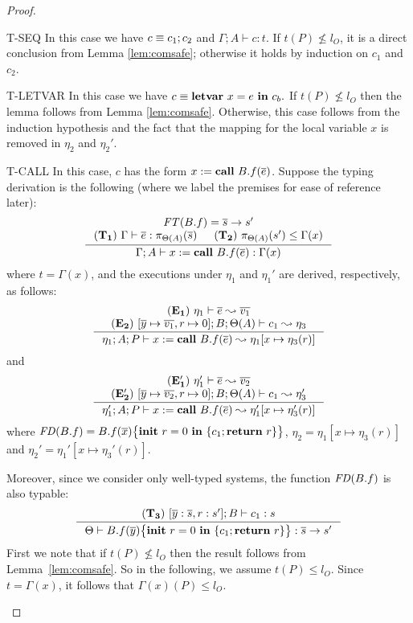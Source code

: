 {{{\begin{proof}
\begin{ProofEnumDesc}
\item[T-SEQ] In this case we have
  $c\equiv{c_1};{c_2}$ and $\Gamma;A\vdash c:t$. If $t(P)\not\leq l_{O}$, it is a direct conclusion from Lemma \ref{lem:comsafe}; otherwise it holds by induction on $c_1$ and $c_2$.

\item[T-LETVAR]
  In this case we have $c\equiv{\textbf{letvar}~ {x} = {e} ~\textbf{in}~ {c_b}}.$
  If $t(P) \nleq l_O$ then the lemma follows from Lemma \ref{lem:comsafe}.
  Otherwise, this case follows from the induction hypothesis and the fact
  that the mapping for the local variable $x$ is removed
  in $\eta_2$ and $\eta_2'.$
\item[T-CALL]
In this case, $c$ has the form
${x}:=\textbf{call}~{B.f}({\overline{e}})$. Suppose the typing
derivation is the following (where we label the premises
for ease of reference later):
$$
\inference
{
\FT(B.f) = \overline{s} \rightarrow s' \\
(\mathbf{T_1}) ~ \Gamma \vdash \overline{e} : \app{\overline{s}}{\Theta(A)} &
(\mathbf{T_2}) ~ \app{s'}{\Theta(A)} \leq \Gamma(x)}
{\Gamma; A \vdash \lcCALL{x}{B.f}{\overline{e}} :
 \Gamma(x)  }
$$
where $t = \Gamma(x)$,
and the executions under $\eta_1$ and $\eta_1'$ are
derived, respectively, as follows:
$$
\inference{
(\mathbf{E_1}) ~ \eta_1\vdash\overline{e} \leadsto \overline{v_1} \\
(\mathbf{E_2}) ~ [\overline{y} \mapsto \overline{v_1}, r \mapsto 0] ; B;
  \Theta(A) \vdash c_1 \leadsto \eta_3
}
{\eta_1; A; P \vdash \lcCALL{x}{B.f}{\overline{e}} \leadsto
              \eta_1 [x \mapsto \eta_3(r) ]}
$$
and
$$
\inference{
(\mathbf{E_1'}) ~ \eta_1'\vdash\overline{e} \leadsto \overline{v_2}
\\
(\mathbf{E_2'}) ~ [\overline{y} \mapsto \overline{v_2}, r \mapsto 0] ; B;
\Theta(A) \vdash c_1 \leadsto \eta_3'}
{\eta_1';A;P \vdash \lcCALL{x}{B.f}{\overline{e}} \leadsto
              \eta_1' [x \mapsto \eta_3'(r) ]}
$$
where
$\mathit{FD}(B.f) = {B.f}(\overline{x})\big\{{{\textbf{init}~ {r}=0 ~\textbf{in}~\{{c_1};\textbf{return}~{r}\}}}\big\}$,
$\eta_2 = \eta_1[x \mapsto \eta_3(r)]$
and $\eta_2' = \eta_1'[x \mapsto \eta_3'(r)].$

Moreover, since we consider only well-typed systems,
the function $\mathit{FD}(B.f)$ is also typable:
$$
\inference
    {
      (\mathbf{T_3}) ~ [\overline{y}:\overline{s}, r : s']; B\vdash c_1 : s
    }
    {
      \Theta \vdash \lpFUN{B.f}{\overline{y}}{c_1} :
      \overline{s}\rightarrow s'
    }
$$
First we note that if $t(P) \nleq l_O$ then the result
follows from Lemma~\ref{lem:comsafe}.
So in the following, we assume $t(P) \leq l_O$.
Since $t = \Gamma(x)$, it follows that
$\Gamma(x)(P) \leq l_O.$


\end{ProofEnumDesc}
\end{proof}}}}
